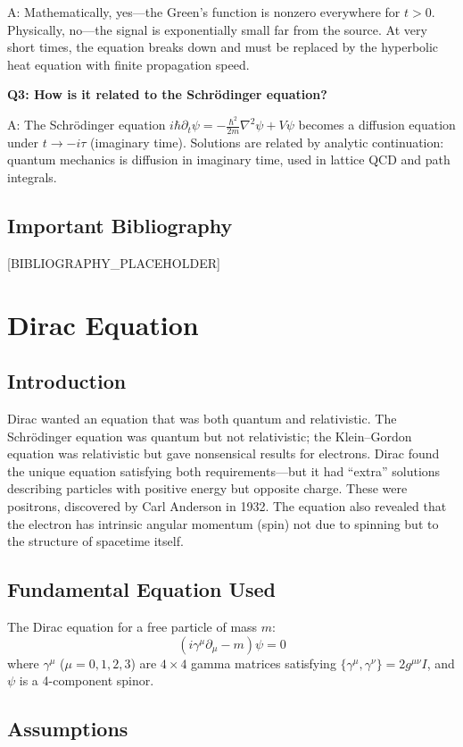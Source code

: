 \documentclass[11pt,openright]{book}
\begin{document}
A: Mathematically, yes---the Green's function is nonzero everywhere for $t > 0$. Physically, no---the signal is exponentially small far from the source. At very short times, the equation breaks down and must be replaced by the hyperbolic heat equation with finite propagation speed.

\textbf{Q3: How is it related to the Schr\"odinger equation?}

A: The Schr\"odinger equation $i\hbar \partial_t \psi = -\frac{\hbar^2}{2m}\nabla^2 \psi + V\psi$ becomes a diffusion equation under $t \to -i\tau$ (imaginary time). Solutions are related by analytic continuation: quantum mechanics is diffusion in imaginary time, used in lattice QCD and path integrals.
\section*{Important Bibliography}

[BIBLIOGRAPHY_PLACEHOLDER]


\chapter{Dirac Equation}

\section*{Introduction}

Dirac wanted an equation that was both quantum and relativistic. The Schr\"odinger equation was quantum but not relativistic; the Klein--Gordon equation was relativistic but gave nonsensical results for electrons. Dirac found the unique equation satisfying both requirements---but it had ``extra'' solutions describing particles with positive energy but opposite charge. These were positrons, discovered by Carl Anderson in 1932. The equation also revealed that the electron has intrinsic angular momentum (spin) not due to spinning but to the structure of spacetime itself.
\section*{Fundamental Equation Used}

The Dirac equation for a free particle of mass $m$:
\[
(i\gamma^\mu \partial_\mu - m)\psi = 0
\]
where $\gamma^\mu$ ($\mu = 0,1,2,3$) are $4\times 4$ gamma matrices satisfying $\{\gamma^\mu, \gamma^\nu\} = 2g^{\mu\nu}I$, and $\psi$ is a 4-component spinor.
\section*{Assumptions}
\end{document}
